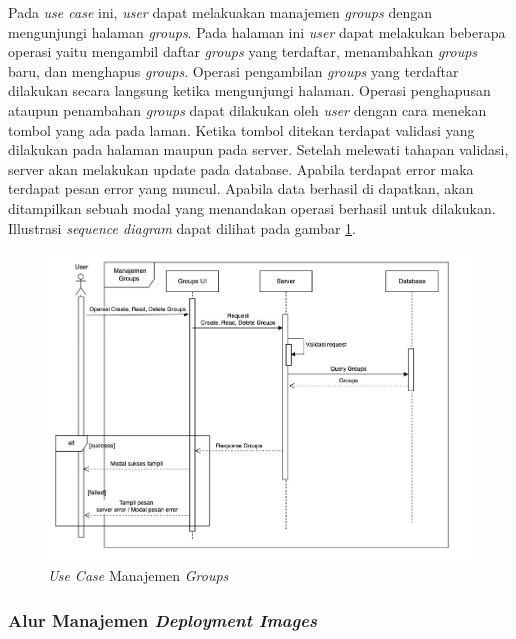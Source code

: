 Pada \textit{use case} ini, \textit{user} dapat melakuakan manajemen \textit{groups} dengan mengunjungi halaman \textit{groups}. Pada halaman ini \textit{user} dapat melakukan beberapa operasi yaitu mengambil daftar \textit{groups} yang terdaftar, menambahkan \textit{groups} baru, dan menghapus \textit{groups}. Operasi pengambilan \textit{groups} yang terdaftar dilakukan secara langsung ketika mengunjungi halaman. Operasi penghapusan ataupun penambahan \textit{groups} dapat dilakukan oleh \textit{user} dengan cara menekan tombol yang ada pada laman. Ketika tombol ditekan terdapat validasi yang dilakukan pada halaman maupun pada server. Setelah melewati tahapan validasi, server akan melakukan update pada database. Apabila terdapat error maka terdapat pesan error yang muncul. Apabila data berhasil di dapatkan, akan ditampilkan sebuah modal yang menandakan operasi berhasil untuk dilakukan. Illustrasi \textit{sequence diagram} dapat dilihat pada gambar \ref{fig:usecase-09}.


\begin{figure}[ht]
  \centering
  \includegraphics[width=1\textwidth]{resources/chapter-3/usecase/uc-09.jpg}
  \caption{\textit{Use Case} Manajemen \textit{Groups}}
  \label{fig:usecase-09}
\end{figure}

\pagebreak

\subsubsection{Alur Manajemen \textit{Deployment Images}}

